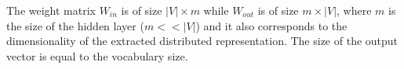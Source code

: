 




The weight matrix $W_{in}$ is of size $|V| \times m$ while $W_{out}$ is of size $m \times |V|$, where $m$ is the size of the hidden layer ($m << |V|$) and it also corresponds to the dimensionality of the extracted distributed representation. The size of the output vector is equal to the vocabulary size. 
%

